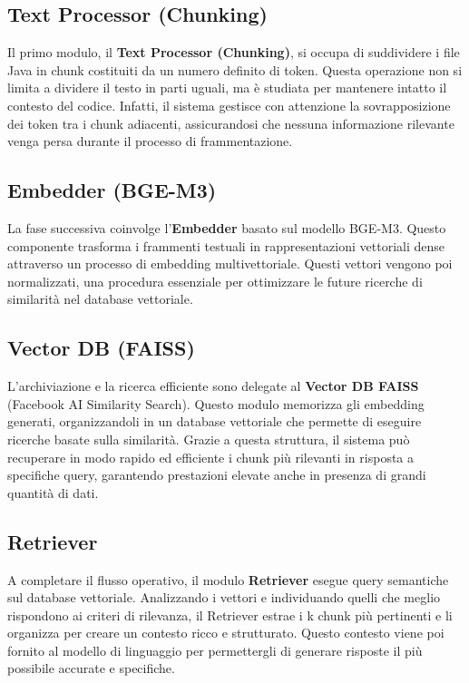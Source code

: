 \documentclass[12pt,a4paper,openright,twoside]{book}
\begin{document}
\subsection{Text Processor (Chunking)}
Il primo modulo, il \textbf{Text Processor (Chunking)}, si occupa di suddividere i file Java in chunk costituiti da un numero definito di token. Questa operazione non si limita a dividere il testo in parti uguali, ma è studiata per mantenere intatto il contesto del codice. Infatti, il sistema gestisce con attenzione la sovrapposizione dei token tra i chunk adiacenti, assicurandosi che nessuna informazione rilevante venga persa durante il processo di frammentazione.
\subsection{Embedder (BGE-M3)}
La fase successiva coinvolge l'\textbf{Embedder} basato sul modello BGE-M3. Questo componente trasforma i frammenti testuali in rappresentazioni vettoriali dense attraverso un processo di embedding multivettoriale.
Questi vettori vengono poi normalizzati, una procedura essenziale per ottimizzare le future ricerche di similarità nel database vettoriale.
\subsection{Vector DB (FAISS)}
L'archiviazione e la ricerca efficiente sono delegate al \textbf{Vector DB FAISS} (Facebook AI Similarity Search). 
Questo modulo memorizza gli embedding generati, organizzandoli in un database vettoriale che permette di eseguire ricerche basate sulla similarità. Grazie a questa struttura, il sistema può recuperare in modo rapido ed efficiente i chunk più rilevanti in risposta a specifiche query, garantendo prestazioni elevate anche in presenza di grandi quantità di dati.
\subsection{Retriever}
A completare il flusso operativo, il modulo \textbf{Retriever} esegue query semantiche sul database vettoriale. Analizzando i vettori e individuando quelli che meglio rispondono ai criteri di rilevanza, il Retriever estrae i k chunk più pertinenti e li organizza per creare un contesto ricco e strutturato. Questo contesto viene poi fornito al modello di linguaggio per permettergli di generare risposte il più possibile accurate e specifiche.
\end{document}
